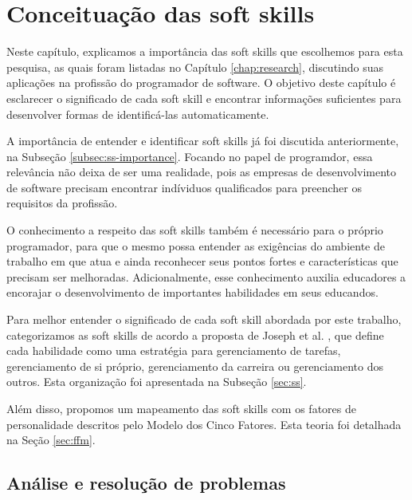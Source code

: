 

\chapter{Conceituação das soft skills}

\label{chap:concepts}
\thispagestyle{empty} %

Neste capítulo, explicamos a importância das soft skills que escolhemos para esta pesquisa, as quais foram listadas no Capítulo \ref{chap:research}, discutindo suas aplicações na profissão do programador de software. O objetivo deste capítulo é esclarecer o significado de cada soft skill e encontrar informações suficientes para desenvolver formas de identificá-las automaticamente.

A importância de entender e identificar soft skills já foi discutida anteriormente, na Subseção \ref{subsec:ss-importance}. Focando no papel de programdor, essa relevância não deixa de ser uma realidade, pois as empresas de desenvolvimento de software precisam encontrar indíviduos qualificados para preencher os requisitos da profissão.

O conhecimento a respeito das soft skills também é necessário para o próprio programador, para que o mesmo possa entender as exigências do ambiente de trabalho em que atua e ainda reconhecer seus pontos fortes e características que precisam ser melhoradas. Adicionalmente, esse conhecimento auxilia educadores a encorajar o desenvolvimento de importantes habilidades em seus educandos.

Para melhor entender o significado de cada soft skill abordada por este trabalho, categorizamos as soft skills de acordo a proposta de Joseph et al. \cite{joseph:99} \cite{joseph:10}, que define cada habilidade como uma estratégia para gerenciamento de tarefas, gerenciamento de si próprio, gerenciamento da carreira ou gerenciamento dos outros. Esta organização foi apresentada na Subseção \ref{sec:ss}.

Além disso, propomos um mapeamento das soft skills com os fatores de personalidade descritos pelo Modelo dos Cinco Fatores. Esta teoria foi detalhada na Seção \ref{sec:ffm}.

\section{Análise e resolução de problemas}

